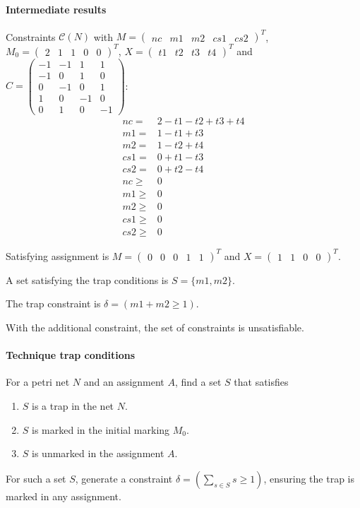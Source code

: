\documentclass{article}
\begin{document}
\paragraph{Intermediate results}
Constraints $\mathcal C(N)$ with
$M =\begin{pmatrix}nc & m1 & m2 & cs1 & cs2 \end{pmatrix}^T$,
$M_0 =\begin{pmatrix}2 & 1 & 1 & 0 & 0 \end{pmatrix}^T$,
$X =\begin{pmatrix}t1 & t2 & t3 & t4 \end{pmatrix}^T$ and
$C =\begin{pmatrix}
  -1 & -1 & 1 & 1 \\
  -1 &  0 & 1 & 0 \\
   0 & -1 & 0 & 1 \\
  1 & 0 & -1 & 0 \\
  0 & 1 & 0 & -1
\end{pmatrix}$:
\begin{align*}
  nc   =& 2 - t1 - t2 + t3 + t4 \\
  m1  =& 1 - t1 + t3 \\
  m2  =& 1 - t2 + t4 \\
  cs1 =& 0 + t1 - t3 \\
  cs2 =& 0 + t2 - t4 \\
  nc \ge& 0 \\
  m1 \ge& 0 \\
  m2 \ge& 0 \\
  cs1 \ge& 0 \\
  cs2 \ge& 0
\end{align*}

Satisfying assignment is
$M =\begin{pmatrix}0 & 0 & 0 & 1 & 1 \end{pmatrix}^T$ and
$X =\begin{pmatrix}1 & 1 & 0 & 0 \end{pmatrix}^T$.

A set satisfying the trap conditions is $S = \{m1, m2\}$.

The trap constraint is $\delta = (m1 + m2 \ge 1)$.

With the additional constraint, the set of constraints is unsatisfiable.

\paragraph{Technique trap conditions} For a petri net $N$ and an assignment $A$,
find a set $S$ that satisfies
\begin{enumerate}
  \item $S$ is a trap in the net $N$.
  \item $S$ is marked in the initial marking $M_0$.
  \item $S$ is unmarked in the assignment $A$.
\end{enumerate}
For such a set $S$, generate a constraint
$\delta = \left( \sum_{s \in S} s \ge 1 \right)$, ensuring the
trap is marked in any assignment.
\end{document}
